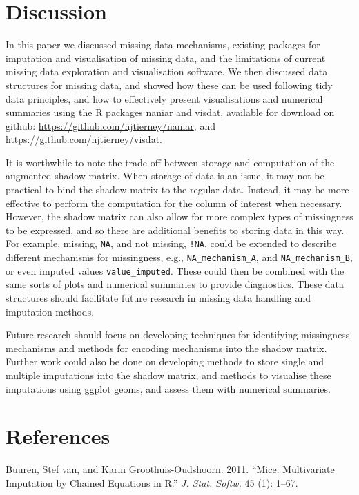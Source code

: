 \documentclass[]{article}
\begin{document}
\section{Discussion}\label{discussion}

In this paper we discussed missing data mechanisms, existing packages
for imputation and visualisation of missing data, and the limitations of
current missing data exploration and visualisation software. We then
discussed data structures for missing data, and showed how these can be
used following tidy data principles, and how to effectively present
visualisations and numerical summaries using the R packages naniar and
visdat, available for download on github:
\url{https://github.com/njtierney/naniar}, and
\url{https://github.com/njtierney/visdat}.

It is worthwhile to note the trade off between storage and computation
of the augmented shadow matrix. When storage of data is an issue, it may
not be practical to bind the shadow matrix to the regular data. Instead,
it may be more effective to perform the computation for the column of
interest when necessary. However, the shadow matrix can also allow for
more complex types of missingness to be expressed, and so there are
additional benefits to storing data in this way. For example, missing,
\texttt{NA}, and not missing, \texttt{!NA}, could be extended to
describe different mechanisms for missingness, e.g.,
\texttt{NA\_mechanism\_A}, and \texttt{NA\_mechanism\_B}, or even
imputed values \texttt{value\_imputed}. These could then be combined
with the same sorts of plots and numerical summaries to provide
diagnostics. These data structures should facilitate future research in
missing data handling and imputation methods.

Future research should focus on developing techniques for identifying
missingness mechanisms and methods for encoding mechanisms into the
shadow matrix. Further work could also be done on developing methods to
store single and multiple imputations into the shadow matrix, and
methods to visualise these imputations using ggplot geoms, and assess
them with numerical summaries.

\section*{References}\label{references}

\hypertarget{refs}{}
\hypertarget{ref-mice}{}
Buuren, Stef van, and Karin Groothuis-Oudshoorn. 2011. ``Mice:
Multivariate Imputation by Chained Equations in R.'' \emph{J. Stat.
Softw.} 45 (1): 1--67.
\end{document}
